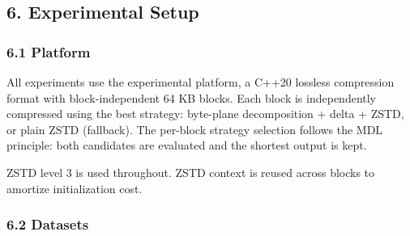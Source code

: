 \documentclass[
  11pt,
  letterpaper,
]{article}
\makeatletter
\renewcommand{\_}{\bpd@origunderscore\allowbreak}
\makeatother
\begin{document}
\hypertarget{experimental-setup}{%
\subsection{6. Experimental Setup}\label{experimental-setup}}

\hypertarget{platform}{%
\subsubsection{6.1 Platform}\label{platform}}

All experiments use the experimental platform, a C++20 lossless
compression format with block-independent 64 KB blocks. Each block is
independently compressed using the best strategy: byte-plane
decomposition + delta + ZSTD, or plain ZSTD (fallback). The per-block
strategy selection follows the MDL principle: both candidates are
evaluated and the shortest output is kept.

ZSTD level 3 is used throughout. ZSTD context is reused across blocks to
amortize initialization cost.

\hypertarget{datasets}{%
\subsubsection{6.2 Datasets}\label{datasets}}
\end{document}
